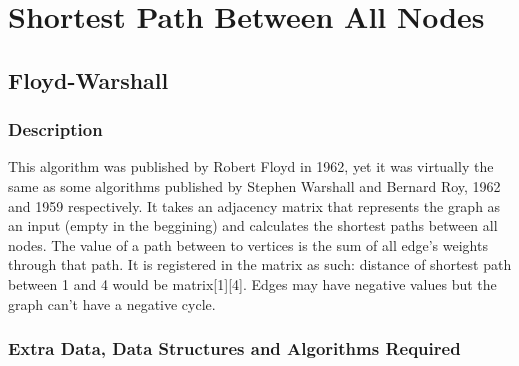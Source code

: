 \section{Shortest Path Between All Nodes}


\subsection{Floyd-Warshall}

\subsubsection{Description}
This algorithm was published by Robert Floyd in 1962, yet it was virtually the same as some algorithms published by Stephen Warshall and Bernard Roy, 1962 and 1959 respectively. It takes an adjacency matrix that represents the graph as an input (empty in the beggining) and calculates the shortest paths between all nodes. The value of a path between to vertices is the sum of all edge's weights through that path. It is registered in the matrix as such: distance of shortest path between 1 and 4 would be matrix[1][4]. Edges may have negative values but the graph can't have a negative cycle.

\subsubsection{Extra Data, Data Structures and Algorithms Required}